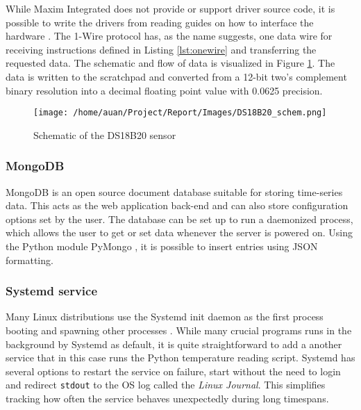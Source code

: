While Maxim Integrated does not provide or support driver source code, it is possible to write the drivers from reading guides on how to interface the hardware \cite{DS18B20ProgrammableResolution}. The 1-Wire protocol has, as the name suggests, one data wire for receiving instructions defined in Listing \ref{lst:onewire} and transferring the requested data. The schematic and flow of data is visualized in Figure \ref{fig:sensorschem}. The data is written to the scratchpad and converted from a 12-bit two's complement binary resolution into a decimal floating point value with 0.0625 precision.

\begin{figure}[h]
  \centering
  \texttt{[image: /home/auan/Project/Report/Images/DS18B20\_schem.png]}
  \caption{Schematic of the DS18B20 sensor \cite{DS18B20ProgrammableResolution}}
  \label{fig:sensorschem}
\end{figure}
\subsubsection{MongoDB}%
\label{ssub:mongodb}
MongoDB is an open source document database suitable for storing time-series data. This acts as the web application back-end and can also store configuration options set by the user. The database can be set up to run a daemonized process, which allows the user to get or set data whenever the server is powered on. Using the Python module PyMongo \cite{PyMongo}, it is possible to insert entries using JSON formatting.

\subsubsection{Systemd service}%
\label{ssub:systemd_service}
Many Linux distributions use the Systemd init daemon as the first process booting and spawning other processes \cite{SystemdArchWiki}. While many crucial programs runs in the background by Systemd as default, it is quite straightforward to add a another service that in this case runs the Python temperature reading script. Systemd has several options to restart the service on failure, start without the need to login and redirect \verb|stdout| to the OS log called the \textit{Linux Journal}. This simplifies tracking how often the service behaves unexpectedly during long timespans.



